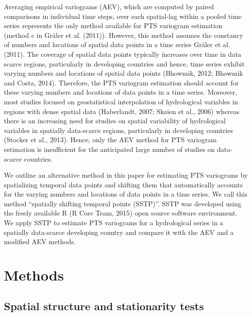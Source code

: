 Averaging empirical variograms (AEV), which are computed by paired comparisons in individual time steps, over each spatial-lag within a pooled time series represents the only method available for PTS variogram estimation (method c in Gräler et al. (2011)). However, this method assumes the constancy of numbers and locations of spatial data points in a time series Gräler et al. (2011). The coverage of spatial data points typically increases over time in data scarce regions, particularly in developing countries and hence, time series exhibit varying numbers and locations of spatial data points (Bhowmik, 2012; Bhowmik and Costa, 2014). Therefore, the PTS variogram estimation should account for these varying numbers and locations of data points in a time series. Moreover, most studies focused on geostatistical interpolation of hydrological variables in regions with dense spatial data (Haberlandt, 2007; Skøien et al., 2006) whereas there is an increasing need for studies on spatial variability of hydrological variables in spatially data-scarce regions, particularly in developing countries (Stocker et al., 2013). Hence, only the AEV method for PTS variogram estimation is insufficient for the anticipated large number of studies on data-scarce countries.

We outline an alternative method in this paper for estimating PTS variograms by spatializing temporal data points and shifting them that automatically accounts for the varying numbers and locations of data points in a time series. We call this method “spatially shifting temporal points (SSTP)”. SSTP was developed using the freely available R (R Core Team, 2015) open source software environment. We apply SSTP to estimate PTS variograms for a hydrological series in a spatially data-scarce developing country and compare it with the AEV and a modified AEV methods.

\section{Methods}
\label{Methods}

\subsection{Spatial structure and stationarity tests}
\label{Spatial structure and stationarity tests}

